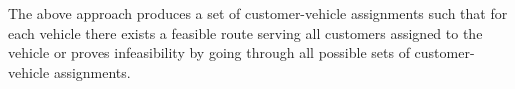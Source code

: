 \documentclass[dissertation,draft*]{aaltoseries}
\begin{document}

% 
% 


The above approach produces a set of customer-vehicle assignments 
such that for each vehicle there exists a feasible route serving all customers assigned to the vehicle
or proves infeasibility by going through all possible sets of customer-vehicle assignments.
\end{document}
